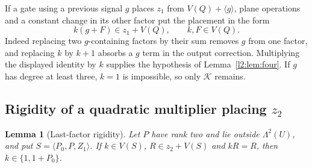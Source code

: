 \documentclass[11pt,a4paper]{article}
\theoremstyle{plain}
\newtheorem{lemma}[theorem]{Lemma}
\theoremstyle{remark}
\begin{document}
If a gate using a previous signal $g$ places $z_1$ from $V(Q)+\langle g\rangle$, plane operations and a constant change in its other factor put the placement in the form
\[
k(g+F)\in z_1+V(Q),\qquad k,F\in V(Q).
\]
Indeed replacing two $g$-containing factors by their sum removes $g$ from one factor, and replacing $k$ by $k+1$ absorbs a $g$ term in the output correction. Multiplying the displayed identity by $k$ supplies the hypothesis of Lemma~\ref{l2:lem:four}. If $g$ has degree at least three, $k=1$ is impossible, so only $\mathcal K$ remains.

\subsection[Rigidity of a quadratic multiplier placing z2]{Rigidity of a quadratic multiplier placing $z_2$}
\begin{lemma}[Last-factor rigidity]\label{l2:lem:lastfactor}
Let $P$ have rank two and lie outside $\Lambda^2(U)$, and put $S=\langle P_0,P,Z_1\rangle$. If $k\in V(S)$, $R\in z_2+V(S)$ and $kR=R$, then $k\in\{1,1+P_0\}$.
\end{lemma}
\end{document}
